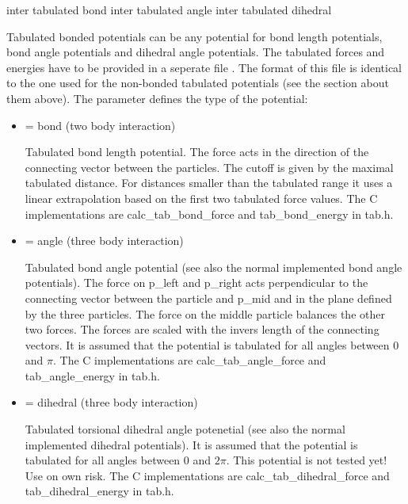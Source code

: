 \begin{essyntax}
     inter  
    tabulated bond 
     inter  
    tabulated angle 
     inter  
    tabulated dihedral 
\end{essyntax}

Tabulated bonded potentials can be any potential for bond length
potentials, bond angle potentials and dihedral angle potentials. The
tabulated forces and energies have to be provided in a seperate file
. The format of this file is identical to the one used
for the non-bonded tabulated potentials (see the section about them
above). The parameter  defines the type of the potential:

\begin{itemize}
  \item {} = bond (two body interaction)

    Tabulated bond length potential. The force acts in the direction
    of the connecting vector between the particles. The cutoff is
    given by the maximal tabulated distance. For distances smaller
    than the tabulated range it uses a linear extrapolation based on
    the first two tabulated force values. The C implementations are
    calc_tab_bond_force and tab_bond_energy in tab.h.

  \item {} = angle (three body interaction)

    Tabulated bond angle potential (see also the normal implemented
    bond angle potentials). The force on p_left and p_right acts
    perpendicular to the connecting vector between the particle and
    p_mid and in the plane defined by the three particles. The force
    on the middle particle balances the other two forces. The forces
    are scaled with the invers length of the connecting vectors. It is
    assumed that the potential is tabulated for all angles between 0
    and $ \pi $. The C implementations are calc_tab_angle_force and
    tab_angle_energy in tab.h.

  \item {} = dihedral (three body interaction)

    Tabulated torsional dihedral angle potenetial (see also the normal
    implemented dihedral potentials). It is assumed that the potential
    is tabulated for all angles between 0 and $ 2\pi $. This potential
    is not tested yet! Use on own risk. The C implementations are
    calc_tab_dihedral_force and tab_dihedral_energy in tab.h.

\end{itemize}

